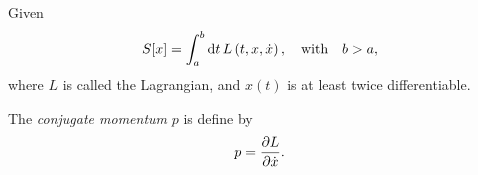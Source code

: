 \begin{question}
Given
\[
	S[x] = \int_{a}^{b}\mathrm{d} t\, L\left(t, x, \dot{x}\right),\quad\text{with}\quad b>a,
\]
where $L$ is called the Lagrangian, and $x(t)$ is at least twice differentiable.

The \textit{conjugate momentum} $p$ is define by
\begin{equation}
	\label{eq:5.1}
	p = \frac{\partial L}{\partial \dot{x}}.
\end{equation}
\qpart %

\qpart %

\qpart %

\qpart %

\qpart %

\end{question}
